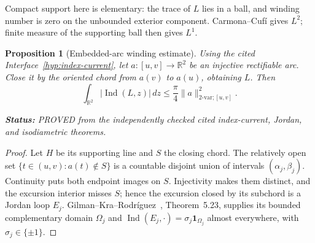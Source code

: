 \documentclass[11pt]{article}
\newtheorem{proposition}[theorem]{Proposition}
\theoremstyle{definition}
\theoremstyle{remark}
\newcommand{\R}{\mathbb R}
\newcommand{\Ind}{\operatorname{Ind}}
\newcommand{\status}[1]{\par\smallskip\noindent\textbf{Status:}
  \begingroup\small\sffamily #1.\endgroup\par\smallskip}
\begin{document}
Compact support here is elementary: the trace of $L$ lies in a ball, and
winding number is zero on the unbounded exterior component.  Carmona--Cuf\'i
gives $L^2$; finite measure of the supporting ball then gives $L^1$.

\begin{proposition}[Embedded-arc winding estimate]\label{prop:arc}
Using the cited Interface~\ref{hyp:index-current}, let
$a\colon[u,v]\to\R^2$ be an injective rectifiable arc.  Close it by the
oriented chord from $a(v)$ to $a(u)$, obtaining $L$.  Then
\[
 \int_{\R^2}|\Ind(L,z)|\,dz
 \leq\frac\pi4\|a\|_{2\text{-var};[u,v]}^2.             \tag{5.1}
\]
\status{PROVED from the independently checked cited index-current, Jordan,
and isodiametric theorems}
\end{proposition}

\begin{proof}
Let $H$ be its supporting line and $S$ the closing chord.  The relatively
open set
$\{t\in(u,v):a(t)\notin S\}$ is a countable disjoint union of intervals
$(\alpha_j,\beta_j)$.  Continuity puts both endpoint images on $S$.
Injectivity makes them distinct, and the excursion interior misses $S$;
hence the excursion closed by its subchord is a Jordan loop $E_j$.
Gilman--Kra--Rodr\'iguez~\cite{GKR}, Theorem~5.23, supplies its bounded complementary
domain $\Omega_j$ and
$\Ind(E_j,\cdot)=\sigma_j\mathbf1_{\Omega_j}$ almost everywhere, with
$\sigma_j\in\{\pm1\}$.


\end{proof}
\end{document}
